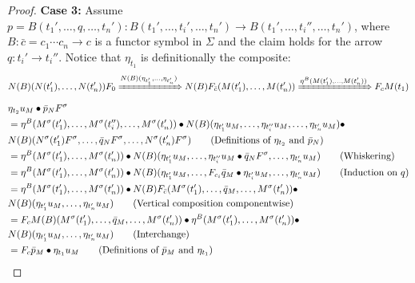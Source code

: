 \documentclass[11pt]{article}
\theoremstyle{plain}
\theoremstyle{definition}
\numberwithin{equation}{section}
\begin{document}
\begin{proof}
  \noindent \textbf{Case 3:} Assume $p = B(t_1',\ldots, q,\ldots, t_n')\colon B(t_1',\ldots, t_i',\ldots, t_n')\to B(t_1',\ldots, t_i'',\ldots, t_n')$, where $B\colon \bar{c} = c_1\cdots c_n\to c$ is a functor symbol in $\Sigma$ and the claim holds for the arrow $q\colon t_i'\to t_i''$. Notice that $\eta_{t_1}$ is definitionally the composite:
  {\small$$
  N(B)(N(t_1'),\ldots, N(t_n'))F_0\xRightarrow{N(B)(\eta_{t_1'},\ldots, \eta_{t_n'})} N(B)F_{\bar{c}}(M(t_1'),\ldots, M(t_n'))\xRightarrow{\eta^B(M(t_1'),\ldots, M(t_n'))} F_cM(t_1)
  $$}
  {\small\noindent
  \begin{align*}
       &\eta_{t_2}u_M\bullet \bar{p}_NF^\sigma\\
       &= \eta^B(M^\sigma(t_1'),\ldots, M^\sigma(t_i''),\ldots,  M^\sigma(t_n'))\bullet N(B)(\eta_{t_1'}u_M,\ldots,\eta_{t_i''}u_M,\ldots, \eta_{t_n'}u_M)\bullet\\
       & N(B)(N^\sigma(t_1')F^\sigma,\ldots,\bar{q}_N F^\sigma,\ldots, N^\sigma(t_n')F^\sigma) \tag{Definitions of $\eta_{t_2}$ and $\bar{p}_N$}\\
       &=  \eta^B(M^\sigma (t_1'),\ldots, M^\sigma(t_n'))\bullet N(B)(\eta_{t_1'}u_M, \ldots, \eta_{t_i''}u_M\bullet\bar{q}_NF^\sigma, \ldots, \eta_{t_n'}u_M)\tag{Whiskering}\\
       &= \eta^B(M^\sigma (t_1'),\ldots, M^\sigma(t_n'))\bullet N(B)(\eta_{t_1'}u_M,\ldots, F_{c_i}\bar{q}_M\bullet \eta_{t_i'}u_M,\ldots, \eta_{t_n'}u_M)\tag{Induction on $q$}\\
       &= \eta^B(M^\sigma (t_1'),\ldots, M^\sigma(t_n'))\bullet N(B)F_{\bar{c}}(M^\sigma(t_1'),\ldots,\bar{q}_M,\ldots, M^\sigma(t_n'))\bullet \\
       & N(B)(\eta_{t_1'}u_M,\ldots, \eta_{t_n'}u_M)\tag{Vertical composition componentwise}\\
       &= F_cM(B)(M^\sigma(t_1'),\ldots, \bar{q}_M,\ldots, M^\sigma(t_n'))\bullet \eta^B(M^\sigma(t_1'),\ldots, M^\sigma(t_n'))\bullet\\
       &N(B)(\eta_{t_1'}u_M,\ldots, \eta_{t_n'}u_M)\tag{Interchange}\\
       &= F_c\bar{p}_M\bullet \eta_{t_1}u_M \tag{Definitions of $\bar{p}_M$ and $\eta_{t_1}$}
  \end{align*}
  }


\end{proof}
\end{document}
